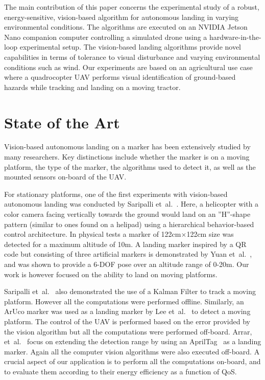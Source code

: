 \documentclass[conference]{IEEEtran}
\begin{document}
The main contribution of this paper concerns the experimental study of a robust, energy-sensitive, vision-based algorithm for autonomous landing in varying environmental conditions. The algorithms are executed on an NVIDIA Jetson Nano companion computer controlling a simulated drone using a hardware-in-the-loop experimental setup. The vision-based landing algorithms provide novel capabilities in terms of tolerance to visual disturbance and varying environmental conditions such as wind.
%
Our experiments are based on an agricultural use case where a quadrocopter UAV performs visual identification of ground-based hazards while tracking and landing on a moving tractor. %

\section{State of the Art}
\label{sec:state-of-the-art}

Vision-based autonomous landing on a marker has been extensively studied by many researchers. Key distinctions include whether the marker is on a moving platform, the type of the marker, the algorithms used to detect it, as well as the mounted sensors on-board of the UAV.

For stationary platforms, one of the first experiments with vision-based autonomous landing was conducted by Saripalli et~al.~\cite{saripalli2002vision}. Here, a helicopter with a color camera facing vertically towards the ground would land on an ”H”-shape pattern (similar to ones found on a helipad) using a hierarchical behavior-based control architecture. In physical tests a marker of 122cm$\times$122cm size was detected for a maximum altitude of 10m. A landing marker inspired by a QR code but consisting of three artificial markers is demonstrated by Yuan et~al.~\cite{yuan2018hierarchical}, and was shown to provide a 6-DOF pose over an altitude range of 0-20m. Our work is however focused on the ability to land on moving platforms.

Saripalli et~al.~\cite{saripalli2003landing} also demonstrated the use of a Kalman Filter to track a moving platform. However all the computations were performed offline. Similarly, an ArUco marker was used as a landing marker by Lee et~al.~\cite{lee2012autonomous} to detect a moving platform. The control of the UAV is performed based on the error provided by the vision algorithm but all the computations were performed off-board. Arrar, et~al.~\cite{araar2017vision} focus on extending the detection range by using an AprilTag~\cite{olson2011apriltag} as a landing marker. Again all the computer vision algorithms were also executed off-board. A crucial aspect of our application is to perform all the computations on-board, and to evaluate them according to their energy efficiency as a function of QoS.
\end{document}
